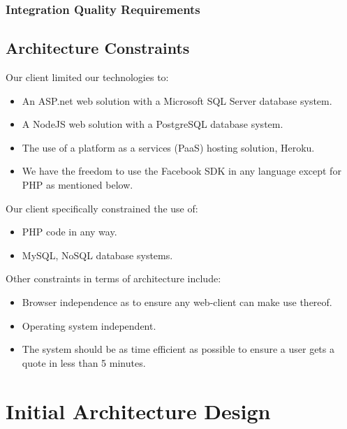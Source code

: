 \documentclass{article}
\begin{document}
		\subsubsection{Integration Quality Requirements}

	
	\subsection{Architecture Constraints}
	Our client limited our technologies to:
	\begin{itemize}
		\item An ASP.net web solution with a Microsoft SQL Server database system.
		\item A NodeJS web solution with a PostgreSQL database system.
		\item The use of a platform as a services (PaaS) hosting solution, Heroku.
		\item We have the freedom to use the Facebook SDK in any language except for PHP as mentioned below.
	\end{itemize}
	Our client specifically constrained the use of:
		\begin{itemize}
		\item PHP code in any way.
		\item MySQL, NoSQL database systems.
		\end{itemize}	
	Other constraints in terms of architecture include:
	\begin{itemize}
		\item Browser independence as to ensure any web-client can make use thereof.
		\item Operating system independent.
		\item The system should be as time efficient as possible to ensure a user gets a quote in less than 5 minutes.
		\end{itemize}
	
	
	\section{Initial Architecture Design}


	


	
\end{document}
